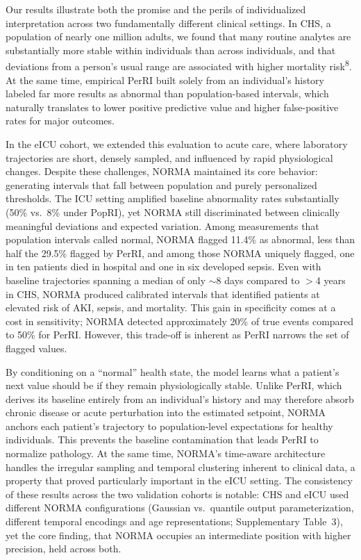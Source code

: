 \documentclass[11pt]{article}
\begin{document}
Our results illustrate both the promise and the perils of individualized interpretation across two fundamentally different clinical settings. In CHS, a population of nearly one million adults, we found that many routine analytes are substantially more stable within individuals than across individuals, and that deviations from a person's usual range are associated with higher mortality risk\textsuperscript{8}. At the same time, empirical PerRI built solely from an individual's history labeled far more results as abnormal than population-based intervals, which naturally translates to lower positive predictive value and higher false-positive rates for major outcomes.

In the eICU cohort, we extended this evaluation to acute care, where laboratory trajectories are short, densely sampled, and influenced by rapid physiological changes. Despite these challenges, NORMA maintained its core behavior: generating intervals that fall between population and purely personalized thresholds. The ICU setting amplified baseline abnormality rates substantially (50\% vs.\ 8\% under PopRI), yet NORMA still discriminated between clinically meaningful deviations and expected variation. Among measurements that population intervals called normal, NORMA flagged 11.4\% as abnormal, less than half the 29.5\% flagged by PerRI, and among those NORMA uniquely flagged, one in ten patients died in hospital and one in six developed sepsis. Even with baseline trajectories spanning a median of only $\sim$8 days compared to $>$4 years in CHS, NORMA produced calibrated intervals that identified patients at elevated risk of AKI, sepsis, and mortality. This gain in specificity comes at a cost in sensitivity; NORMA detected approximately 20\% of true events compared to 50\% for PerRI. However, this trade-off is inherent as PerRI narrows the set of flagged values.

By conditioning on a ``normal'' health state, the model learns what a patient's next value should be if they remain physiologically stable. Unlike PerRI, which derives its baseline entirely from an individual's history and may therefore absorb chronic disease or acute perturbation into the estimated setpoint, NORMA anchors each patient's trajectory to population-level expectations for healthy individuals. This prevents the baseline contamination that leads PerRI to normalize pathology. At the same time, NORMA's time-aware architecture handles the irregular sampling and temporal clustering inherent to clinical data, a property that proved particularly important in the eICU setting. The consistency of these results across the two validation cohorts is notable: CHS and eICU used different NORMA configurations (Gaussian vs.\ quantile output parameterization, different temporal encodings and age representations; Supplementary Table~3), yet the core finding, that NORMA occupies an intermediate position with higher precision, held across both.
\end{document}

